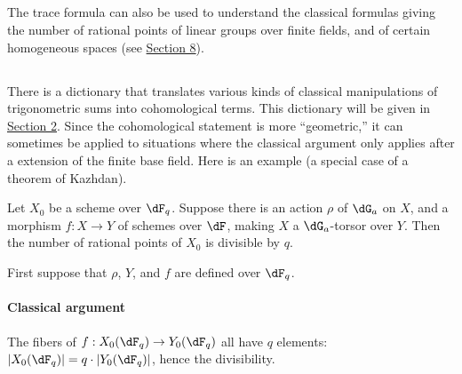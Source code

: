 \subsection{}\label{VI:1-11}

The trace formula can also be used to understand the classical formulas 
giving the number of rational points of linear groups over 
finite fields, and of certain homogeneous spaces (see \hyperref[VI:8]{Section 8}). 





\subsection{}\label{VI:1-12}

There is a dictionary that translates various kinds of classical 
manipulations of trigonometric sums into cohomological terms. This dictionary 
will be given in \hyperref[VI:2]{Section 2}. Since the cohomological statement is more 
``geometric,'' it can sometimes be applied 
to situations where the classical argument only applies after a 
extension of the finite base field. Here is an example (a special case of a 
theorem of Kazhdan).

\begin{theorem_}[Kazhdan]\label{VI:1-13}
Let $X_0$ be a scheme over $\dF_q$. Suppose there is an action $\rho$ of 
$\dG_a$ on $X$, and a morphism $f:X\to Y$ of schemes over $\dF$, making 
$X$ a $\dG_a$-torsor over $Y$. Then the number of rational points of $X_0$ 
is divisible by $q$.
\end{theorem_}

First suppose that $\rho$, $Y$, and $f$ are defined over $\dF_q$. 


\paragraph{Classical argument}
The fibers of $f:X_0(\dF_q)\to Y_0(\dF_q)$ all have $q$ elements: 
$|X_0(\dF_q)| = q\cdot |Y_0(\dF_q)|$, hence the divisibility. 


